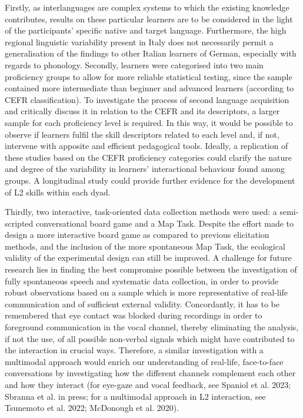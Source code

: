 \begin{stylecaption}
\textup{Firstly, as interlanguages are complex systems to which the existing knowledge contributes, results on these particular learners are to be considered in the light of the participants’ specific native and target language. Furthermore, the high regional linguistic variability present in Italy does not necessarily permit a generalisation of the findings to other Italian learners of German, especially with regards to phonology. Secondly, learners were categorised into two main proficiency groups to allow for more reliable statistical testing, since the sample contained more intermediate than beginner and advanced learners (according to CEFR classification). To investigate the process of second language acquisition and critically discuss it in relation to the CEFR and its descriptors, a larger sample for each proficiency level is required. In this way, it would be possible to observe if learners fulfil the skill descriptors related to each level and, if not, intervene with apposite and efficient pedagogical tools. Ideally, a replication of these studies based on the CEFR proficiency categories could clarify the nature and degree of the variability in learners’ interactional behaviour found among groups. A longitudinal study could provide further evidence for the development of L2 skills within each dyad.}
\end{stylecaption}

\begin{stylecaption}
\textup{Thirdly, two interactive, task-oriented data collection methods were used: a semi-scripted conversational board game and a Map Task. Despite the effort made to design a more interactive board game as compared to previous elicitation methods, and the inclusion of the more spontaneous Map Task, the ecological validity of the experimental design can still be improved. A challenge for future research lies in finding the best compromise possible between the investigation of fully spontaneous speech and systematic data collection, in order to provide robust observations based on a sample which is more representative of real-life communication and of sufficient external validity. }\textup{Concordantly, it has to be remembered that eye contact was blocked during recordings in order to foreground communication in the vocal channel, thereby eliminating the analysis, if not the use, of all possible non-verbal signals which might have contributed to the interaction in crucial ways. Therefore, a similar investigation with a multimodal approach would enrich our understanding of real-life, face-to-face conversations by investigating how the different channels complement each other and how they interact }\textup{(for eye-gaze and vocal feedback, see Spaniol et al. 2023; Sbranna et al. in press; for a multimodal approach in L2 interaction, see Tsunemoto et al. 2022; McDonough et al. 2020)}\textup{.}
\end{stylecaption}

